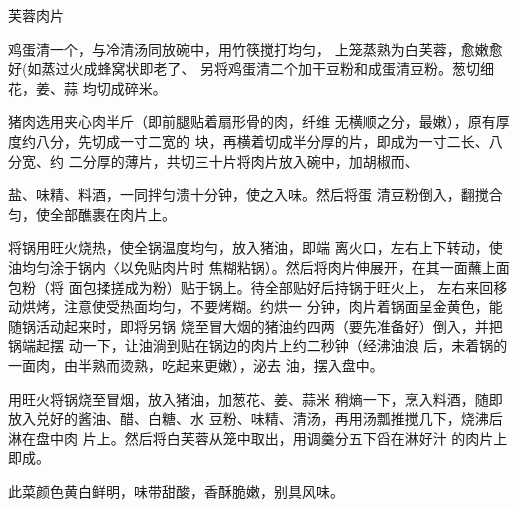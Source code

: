 \begin{recipe}{芙蓉肉片}

\ingredients



\cooking

\step 	鸡蛋清一个，与冷清汤同放碗中，用竹筷搅打均匀， 上笼蒸熟为白芙蓉，愈嫩愈好(如蒸过火成蜂窝状即老了、 另将鸡蛋清二个加干豆粉和成蛋清豆粉。葱切细花，姜、蒜 均切成碎米。

\step 	猪肉选用夹心肉半斤（即前腿贴着扇形骨的肉，纤维 无横顺之分，最嫩），原有厚度约八分，先切成一寸二宽的 块，再横着切成半分厚的片，即成为一寸二长、八分宽、约 二分厚的薄片，共切三十片将肉片放入碗中，加胡椒而、

盐、味精、料酒，一同拌匀溃十分钟，使之入味。然后将蛋 清豆粉倒入，翻搅合匀，使全部醮裹在肉片上。

\step 将锅用旺火烧热，使全锅温度均勻，放入猪油，即端 离火口，左右上下转动，使油均匀涂于锅内〈以免贴肉片时 焦糊粘锅）。然后将肉片伸展开，在其一面蘸上面包粉（将 面包揉搓成为粉）贴于锅上。待全部贴好后持锅于旺火上， 左右来回移动烘烤，注意使受热面均匀，不要烤糊。约烘一 分钟，肉片着锅面呈金黄色，能随锅活动起来时，即将另锅 烧至冒大烟的猪油约四两（要先准备好）倒入，并把锅端起摆 动一下，让油淌到贴在锅边的肉片上约二秒钟（经沸油浪 后，未着锅的一面肉，由半熟而烫熟，吃起来更嫩），泌去 油，摆入盘中。

\step 用旺火将锅烧至冒烟，放入猪油，加葱花、姜、蒜米 稍熵一下，烹入料酒，随即放入兑好的酱油、醋、白糖、水 豆粉、味精、清汤，再用汤瓢推搅几下，烧沸后淋在盘中肉 片上。然后将白芙蓉从笼中取出，用调羹分五下舀在淋好汁 的肉片上即成。

\notes

此菜颜色黄白鲜明，味带甜酸，香酥脆嫩，别具风味。

\end{recipe}

